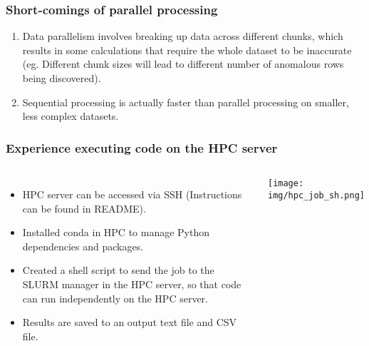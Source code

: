 \documentclass{beamer}
\begin{document}
\begin{frame}
\frametitle{Short-comings of parallel processing}
\begin{enumerate}
    \item Data parallelism involves breaking up data across different chunks, which results in some calculations that require the whole dataset to be inaccurate (eg. Different chunk sizes will lead to different number of anomalous rows being discovered).
    \item Sequential processing is actually faster than parallel processing on smaller, less complex datasets.
\end{enumerate}
\end{frame}

\begin{frame}
    \frametitle{Experience executing code on the HPC server}
    \begin{columns}
        \begin{itemize}
            \item HPC server can be accessed via SSH (Instructions can be found in README).
            \item Installed conda in HPC to manage Python dependencies and packages.
            \item Created a shell script to send the job to the SLURM manager in the HPC server, so that code can run independently on the HPC server. 
            \item Results are saved to an output text file and CSV file.
        \end{itemize}
        
        \centering
        \texttt{[image: img/hpc\_job\_sh.png]}
    \end{columns}
\end{frame}
\end{document}
